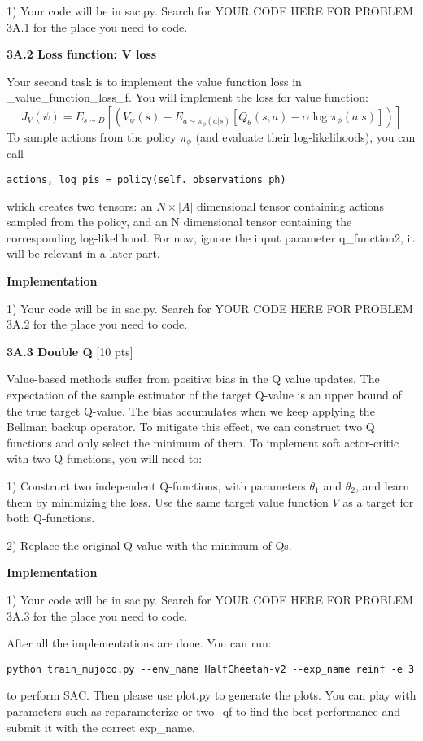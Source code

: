 \documentclass{article}
\begin{document}
1) Your code will be in sac.py. Search for YOUR CODE HERE FOR PROBLEM 3A.1 for the place you need to code. 

\vskip 0.5in

{\bf 3A.2 Loss function: V loss}


Your second task is to implement the value function loss in \_value\_function\_loss\_f. You will implement the loss for value function:
$$
J_V(\psi) = E_{s \sim D}[(V_\psi(s)- E_{a \sim \pi_\phi(a|s)}[Q_\theta(s,a)-\alpha \log \pi_\phi (a|s)])]
$$
To sample actions from the policy $\pi_\phi$ (and evaluate their log-likelihoods), you can call
\begin{verbatim}
actions, log_pis = policy(self._observations_ph)
\end{verbatim}
which creates two tensors: an $N \times |A|$ dimensional tensor containing actions sampled from the policy, and an N dimensional tensor containing the corresponding log-likelihood. For now, ignore the input parameter q\_function2, it will be relevant in a later part.

{\bf Implementation} 

1) Your code will be in sac.py. Search for YOUR CODE HERE FOR PROBLEM 3A.2 for the place you need to code. 

\vskip 0.5in

{\bf 3A.3 Double Q} [10 pts]

Value-based methods suffer from positive bias in the Q value updates.  The expectation of the sample estimator of the target Q-value is an upper bound of the true target Q-value. The bias accumulates when we keep applying the Bellman backup operator. To mitigate this effect, we can construct two Q functions and only select the minimum of them. To implement soft actor-critic with two Q-functions, you will need to:

1) Construct two independent Q-functions, with parameters $\theta_1$ and $\theta_2$, and learn them by minimizing the loss. Use the same target value function $V$ as a target for both Q-functions.

2) Replace the original Q value with the minimum of Qs.

{\bf Implementation} 

1) Your code will be in sac.py. Search for YOUR CODE HERE FOR PROBLEM 3A.3 for the place you need to code.

After all the implementations are done. You can run:
\begin{verbatim}
python train_mujoco.py --env_name HalfCheetah-v2 --exp_name reinf -e 3
\end{verbatim}
to perform SAC. Then please use plot.py to generate the plots. You can play with parameters such as reparameterize or two\_qf to find the best performance and submit it with the correct exp\_name.




\end{document}

